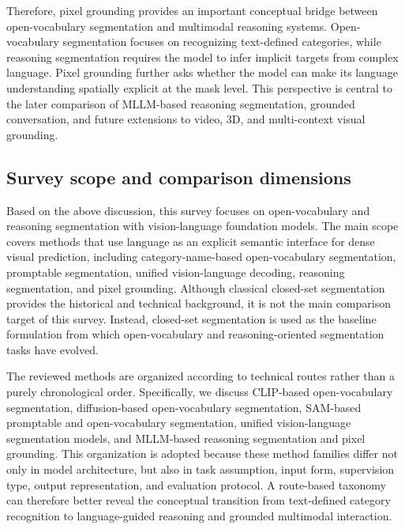 Therefore, pixel grounding provides an important conceptual bridge between open-vocabulary segmentation and multimodal reasoning systems. 
Open-vocabulary segmentation focuses on recognizing text-defined categories, while reasoning segmentation requires the model to infer implicit targets from complex language. 
Pixel grounding further asks whether the model can make its language understanding spatially explicit at the mask level. 
This perspective is central to the later comparison of MLLM-based reasoning segmentation, grounded conversation, and future extensions to video, 3D, and multi-context visual grounding.


\subsection{Survey scope and comparison dimensions}
\label{subsec:scope_dimensions}

Based on the above discussion, this survey focuses on open-vocabulary and reasoning segmentation with vision-language foundation models. 
The main scope covers methods that use language as an explicit semantic interface for dense visual prediction, including category-name-based open-vocabulary segmentation, promptable segmentation, unified vision-language decoding, reasoning segmentation, and pixel grounding. 
Although classical closed-set segmentation provides the historical and technical background, it is not the main comparison target of this survey. 
Instead, closed-set segmentation is used as the baseline formulation from which open-vocabulary and reasoning-oriented segmentation tasks have evolved.

The reviewed methods are organized according to technical routes rather than a purely chronological order. 
Specifically, we discuss CLIP-based open-vocabulary segmentation, diffusion-based open-vocabulary segmentation, SAM-based promptable and open-vocabulary segmentation, unified vision-language segmentation models, and MLLM-based reasoning segmentation and pixel grounding. 
This organization is adopted because these method families differ not only in model architecture, but also in task assumption, input form, supervision type, output representation, and evaluation protocol. 
A route-based taxonomy can therefore better reveal the conceptual transition from text-defined category recognition to language-guided reasoning and grounded multimodal interaction.


